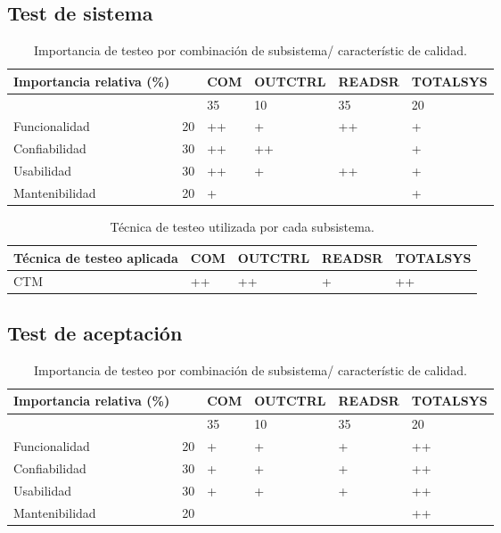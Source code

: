 \documentclass[12pt,a4paper, twosite]{article}
\begin{document}
\subsection{Test de sistema}

\begin{table}[ht]
    \centering
    \begin{tabular}{|l|l|l|l|l|l|}\hline \hline
 Importancia relativa (\%)& &  COM & OUTCTRL & READSR & TOTALSYS\\
        \hline
       
            &  &35 & 10 &35 & 20                          \\
        Funcionalidad    & 20 & ++ & + & ++ & +		\\
        Confiabilidad    & 30 & ++ & ++ & & +                        \\
        Usabilidad       & 30 & ++ & + & ++ & +                        \\
        Mantenibilidad   & 20 & + & &  & +                        \\
        \hline
    \end{tabular}
    \caption{Importancia de testeo por combinación de subsistema/ característic de calidad.}
\end{table}


\begin{table}[ht]
    \centering
    \begin{tabular}{|l|l|l|l|l|}\hline \hline
 Técnica de testeo aplicada & COM & OUTCTRL & READSR & TOTALSYS\\
        \hline
      CTM & ++ &++ &+ & ++ \\
        \hline
    \end{tabular}
    \caption{Técnica de testeo utilizada por cada subsistema.}
\end{table}

\subsection{Test de aceptación}

\begin{table}[ht]
    \centering
    \begin{tabular}{|l|l|l|l|l|l|}\hline \hline
 Importancia relativa (\%)& &  COM & OUTCTRL & READSR & TOTALSYS\\
        \hline
       
            &  &35 & 10 &35 & 20                          \\
        Funcionalidad    & 20 & + & + & + & ++		\\
        Confiabilidad    & 30 & + & + & + & ++                        \\
        Usabilidad       & 30 & + & + & + & ++                        \\
        Mantenibilidad   & 20 &  & &  & ++                        \\
        \hline
    \end{tabular}
    \caption{Importancia de testeo por combinación de subsistema/ característic de calidad.}
\end{table}
\end{document}
